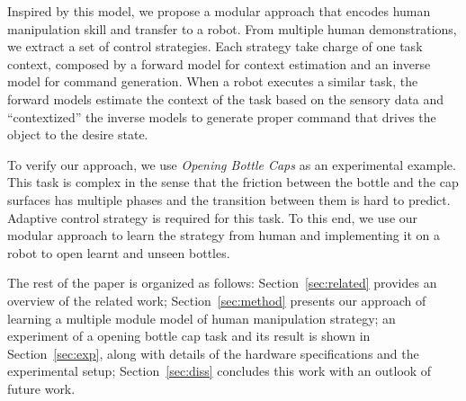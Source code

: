 Inspired by this model, we propose a modular approach that encodes human manipulation skill and transfer to a robot. From multiple human demonstrations, we extract a set of control strategies. Each strategy take charge of one task context, composed by a forward model for context estimation and an inverse model for command generation. When a robot executes a similar task, the forward models estimate the context of the task based on the sensory data and ``contextized'' the inverse models to generate proper command that drives the object to the desire state.

To verify our approach, we use \emph{Opening Bottle Caps} as an experimental example. This task is complex in the sense that the friction between the bottle and the cap surfaces has multiple phases and the transition between them is hard to predict. Adaptive control strategy is required for this task. To this end, we use our modular approach to learn the strategy from human and implementing it on a robot to open learnt and unseen bottles.

The rest of the paper is organized as follows: Section~\ref{sec:related} provides an overview of the related work; Section~\ref{sec:method} presents our approach of learning a multiple module model of human manipulation strategy; an experiment of a opening bottle cap task and its result is shown in Section~\ref{sec:exp}, along with details of the hardware specifications and the experimental setup; Section~\ref{sec:diss} concludes this work with an outlook of future work. 